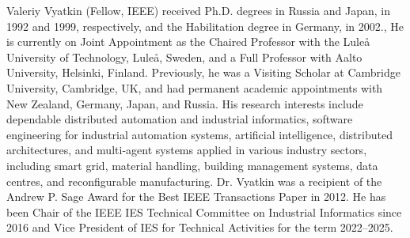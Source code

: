 \documentclass{ieeeojies}
\begin{document}
\begin{IEEEbiography}{Valeriy Vyatkin} (Fellow, IEEE) received Ph.D. degrees in Russia and Japan, in 1992 and 1999, respectively, and the Habilitation degree in Germany, in 2002., He is currently on Joint Appointment as the Chaired Professor with the Luleå University of Technology, Luleå, Sweden, and a Full Professor with Aalto University, Helsinki, Finland. Previously, he was a Visiting Scholar at Cambridge University, Cambridge, UK, and had permanent academic appointments with New Zealand, Germany, Japan, and Russia. His research interests include dependable distributed automation and industrial informatics, software engineering for industrial automation systems, artificial intelligence, distributed architectures, and multi-agent systems applied in various industry sectors, including smart grid, material handling, building management systems, data centres, and reconfigurable manufacturing. Dr. Vyatkin was a recipient of the Andrew P. Sage Award for the Best IEEE Transactions Paper in 2012. He has been Chair of the IEEE IES Technical Committee on Industrial Informatics since 2016 and Vice President of IES for Technical Activities for the term 2022–2025.
\end{IEEEbiography}



\EOD
\end{document}
